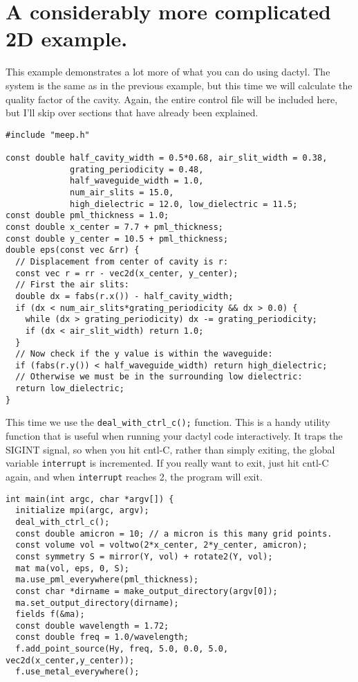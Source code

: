 \begin{comment}
/*
\end{comment}
\section{A considerably more complicated 2D example.}
\begin{comment}
*/
\end{comment}

This example demonstrates a lot more of what you can do using dactyl.  The
system is the same as in the previous example, but this time we will
calculate the quality factor of the cavity.  Again, the entire control file
will be included here, but I'll skip over sections that have already been
explained.

\begin{verbatim}
#include "meep.h"

const double half_cavity_width = 0.5*0.68, air_slit_width = 0.38,
             grating_periodicity = 0.48,
             half_waveguide_width = 1.0,
             num_air_slits = 15.0,
             high_dielectric = 12.0, low_dielectric = 11.5;
const double pml_thickness = 1.0;
const double x_center = 7.7 + pml_thickness;
const double y_center = 10.5 + pml_thickness;
double eps(const vec &rr) {
  // Displacement from center of cavity is r:
  const vec r = rr - vec2d(x_center, y_center);
  // First the air slits:
  double dx = fabs(r.x()) - half_cavity_width;
  if (dx < num_air_slits*grating_periodicity && dx > 0.0) {
    while (dx > grating_periodicity) dx -= grating_periodicity;
    if (dx < air_slit_width) return 1.0;
  }
  // Now check if the y value is within the waveguide:
  if (fabs(r.y()) < half_waveguide_width) return high_dielectric;
  // Otherwise we must be in the surrounding low dielectric:
  return low_dielectric;
}
\end{verbatim}
This time we use the \verb!deal_with_ctrl_c();! function.  This is a handy
utility function that is useful when running your dactyl code
interactively.  It traps the SIGINT signal, so when you hit cntl-C, rather
than simply exiting, the global variable \verb!interrupt! is incremented.
If you really want to exit, just hit cntl-C again, and when
\verb!interrupt! reaches 2, the program will exit.
\begin{verbatim}
int main(int argc, char *argv[]) {
  initialize mpi(argc, argv);
  deal_with_ctrl_c();
  const double amicron = 10; // a micron is this many grid points.
  const volume vol = voltwo(2*x_center, 2*y_center, amicron);
  const symmetry S = mirror(Y, vol) + rotate2(Y, vol);
  mat ma(vol, eps, 0, S);
  ma.use_pml_everywhere(pml_thickness);
  const char *dirname = make_output_directory(argv[0]);
  ma.set_output_directory(dirname);
  fields f(&ma);
  const double wavelength = 1.72;
  const double freq = 1.0/wavelength;
  f.add_point_source(Hy, freq, 5.0, 0.0, 5.0, vec2d(x_center,y_center));
  f.use_metal_everywhere();
\end{verbatim}
